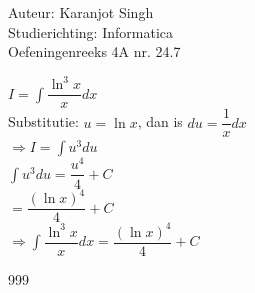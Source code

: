 \documentclass[a4paper]{article}
\begin{document}
\noindent \large Auteur: Karanjot Singh \\
\noindent \large Studierichting: Informatica \\
\noindent \large Oefeningenreeks 4A nr. 24.7 \\

\normalsize

$I = \displaystyle\int \dfrac{\ln^3 x}{x} dx$ \\

Substitutie: $u = \ln x$, dan is $du = \dfrac{1}{x} dx$ \\

$\Rightarrow I = \displaystyle\int u^3 du$ \\

$\displaystyle\int u^3 du = \dfrac{u^4}{4} + C$ \\

$= \dfrac{(\ln x)^4}{4} + C$ \\

$\Rightarrow \displaystyle\int \dfrac{\ln^3 x}{x} dx = \dfrac{(\ln x)^4}{4} + C$ \\

\begin{thebibliography}{999}
\end{thebibliography}
\end{document}
